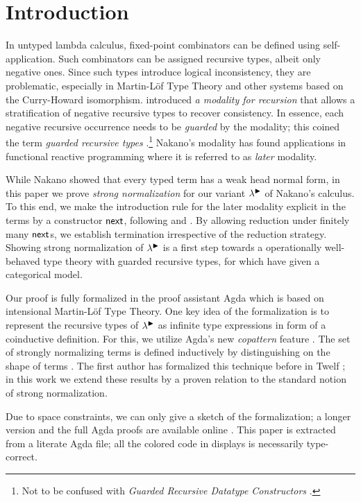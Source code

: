 
\section{Introduction}
\label{sec:intro}

In untyped lambda calculus, fixed-point combinators can be defined
using self-app\-li\-ca\-tion.  Such combinators can be assigned recursive
types, albeit only negative ones.  Since such types introduce logical
inconsistency, they are problematic, especially in Martin-L\"of
Type Theory and other systems based on the Curry-Howard isomorphism.
\citet{nakano:lics00} introduced \emph{a modality for recursion} that
allows a stratification of negative recursive types to recover
consistency.  In essence, each negative recursive occurrence needs to
be \emph{guarded} by the modality; this coined the term \emph{guarded
  recursive types} \citep{birkedalMogelberg:lics13}.\footnote{Not to
  be confused with \emph{Guarded Recursive Datatype Constructors}
  \citep{xiChenChen:popl03}.} 
Nakano's modality has found applications in functional reactive
programming \citep{krishnaswamiBenton:lics11} where it is referred to
as \emph{later} modality.

While Nakano showed that every typed term has a weak head normal form,
in this paper we prove \emph{strong normalization} for our variant
$\lambda^{\mathord{\blacktriangleright}}$ of Nakano's calculus.  
To this end, we
make the introduction rule for the later modality explicit in the
terms by a constructor $\mathsf{next}$, following
\citet{birkedalMogelberg:lics13} and \citet{atkeyMcBride:icfp13}.  By
allowing reduction under finitely many $\mathsf{next}$s, we establish
termination irrespective of the reduction strategy.  
%
Showing strong normalization of $\lambda^{\mathord{\blacktriangleright}}$ is a first step towards
a operationally well-behaved type theory with guarded recursive types, for
which \citet{birkedalMogelberg:lics13} have given a categorical model.

Our proof is fully formalized in the proof assistant Agda
\citep{agda24} which is based on intensional Martin-L\"of Type Theory.
One key idea of the formalization is to represent the recursive types
of $\lambda^{\mathord{\blacktriangleright}}$ as infinite type expressions in form of a
coinductive definition.  For this, we utilize Agda's new
\emph{copattern} feature \cite{abelPientkaThibodeauSetzer:popl13}.  
The set of strongly normalizing terms is defined inductively by
distinguishing on the shape of terms
\citep{raamsdonk:perpetualReductions,matthes:shortproofs}.  The first author has
formalized this technique before in Twelf \citep{abel:entcs04};
in this work we extend these results by a  
proven relation to the standard notion of strong normalization. 

Due to space constraints, we can only give a sketch of the
formalization; a longer version and
the full Agda proofs 
are available online
\citep{abelVezzosi:guardedNormalization}.
This paper is extracted from a literate Agda file; all the colored
code in displays is necessarily type-correct.

